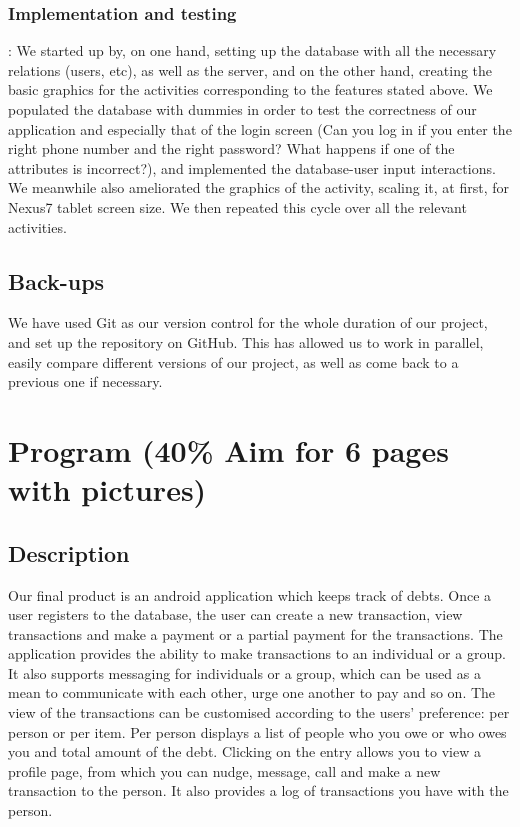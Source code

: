 \documentclass[a4paper,11pt]{article}
\begin{document}
\subsubsection*{Implementation and testing}:
We started up by, on one hand, setting up the database with all the necessary relations (users, etc), as well as the server, and on the other hand, creating the basic graphics for the activities corresponding to the features stated above. We populated the database with dummies in order to test the correctness of our application and especially that of the login screen (Can you log in if you enter the right phone number and the right password? What happens if one of the attributes is incorrect?), and implemented the database-user input interactions. We meanwhile also ameliorated the graphics of the activity, scaling it, at first, for Nexus7 tablet screen size. We then repeated this cycle over all the relevant activities.


\subsection{Back-ups}
We have used Git as our version control for the whole duration of our project, and set up the repository on GitHub. This has allowed us to work in parallel, easily compare different versions of our project, as well as come back to a previous one if necessary.


\section*{Program (40\% Aim for 6 pages with pictures)}
\subsection*{Description}
Our final product is an android application which keeps track of debts. Once a user registers to the database, the user can create a new transaction, view transactions and make a payment or a partial payment for the transactions. The application provides the ability to make transactions to an individual or a group. It also supports messaging for individuals or a group, which can be used as a mean to communicate with each other, urge one another to pay and so on. The view of the transactions can be customised according to the users’ preference: per person or per item. Per person displays a list of people who you owe or who owes you and total amount of the debt. Clicking on the entry allows you to view a profile page, from which you can nudge, message, call and make a new transaction to the person. It also provides a log of transactions you have with the person.
\end{document}
